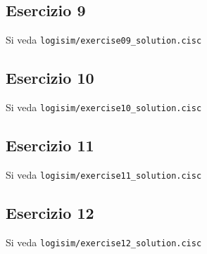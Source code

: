 \documentclass{article}
\def\code#1{\texttt{#1}}
\begin{document}
\subsection*{Esercizio 9}
Si veda \code{logisim/exercise09\_solution.cisc}

\subsection*{Esercizio 10}
Si veda \code{logisim/exercise10\_solution.cisc}

\subsection*{Esercizio 11}
Si veda \code{logisim/exercise11\_solution.cisc}

\subsection*{Esercizio 12}
Si veda \code{logisim/exercise12\_solution.cisc}
\end{document}
